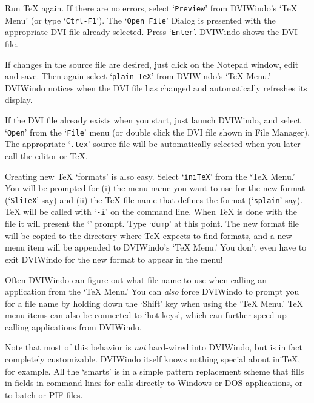 Run {\TeX} again. If there are 
no errors, select `{\tt Preview}' from DVIWindo's `TeX Menu' 
(or type `{\tt Ctrl-F1}'). 
The `{\tt Open File}' Dialog is presented with the appropriate DVI file already
selected.  Press `{\tt Enter}'.  DVIWindo shows the DVI file. 

If changes in the source file are desired, just click on the Notepad
window, edit and save.  Then again select `{\tt plain TeX}' from DVIWindo's
`TeX Menu.'  DVIWindo notices when the DVI file has changed and
automatically refreshes its display. 

If the DVI file already exists when you start, just launch DVIWindo, and
select `{\tt Open}' from the `{\tt File}' menu (or double click the DVI
file shown in File Manager).  The appropriate `{\tt .tex}' source file will be
automatically selected when you later call the editor or {\TeX}.

Creating new {\TeX} `formats' is also easy.  Select `{\tt iniTeX}' from the
`TeX Menu.'  You will be prompted for 
\enspace (i) the menu name you want to use for 
the new format (`{\tt SliTeX}' say) and
\enspace (ii) the {\TeX} file name that defines
the format (`{\tt splain}' say).  {\TeX} will be called with `{\tt -i}' on
the command line.  When {\TeX} is done with the file it will present the
`{\tt *}' prompt. 
Type `{\tt \bs dump}' at this point.  The new format file will be copied to
the directory where {\TeX} expects to find formats, and a new menu item will be
appended to DVIWindo's `TeX Menu.'  You don't even have to exit DVIWindo
for the new format to appear in the menu!

Often DVIWindo can figure out what file name to use when calling an
application from the `TeX Menu.'
You can {\it also\/} force DVIWindo to prompt you for a file name by
holding down the `Shift' key when using the `TeX Menu.'  
{\TeX} menu items can also be connected to `hot keys', 
which can further speed up calling applications from DVIWindo.

Note that most of this behavior is {\it not\/} hard-wired into DVIWindo, but is
in fact completely customizable.  DVIWindo itself knows nothing special
about ini{\TeX}, for example.  All the `smarts' is in a simple pattern
replacement scheme that fills in fields in command lines for calls
directly to Windows or DOS applications, or to batch or PIF files.  

